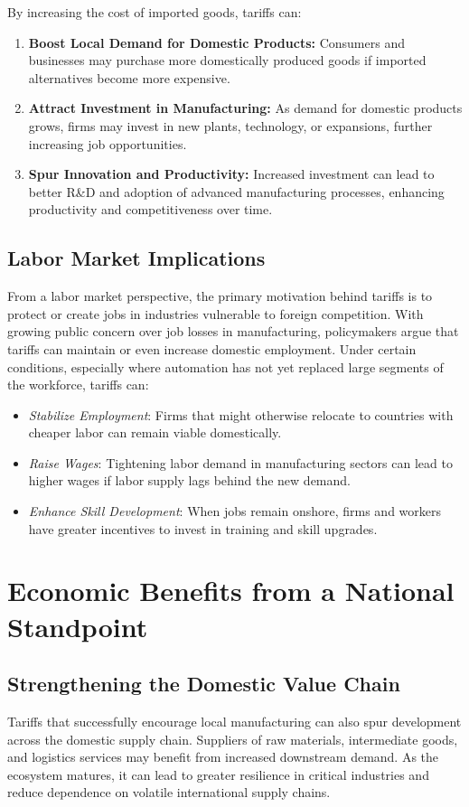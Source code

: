 \documentclass[12pt]{article}
\begin{document}
By increasing the cost of imported goods, tariffs can:
\begin{enumerate}
    \item \textbf{Boost Local Demand for Domestic Products:} Consumers and businesses may purchase more domestically produced goods if imported alternatives become more expensive.
    \item \textbf{Attract Investment in Manufacturing:} As demand for domestic products grows, firms may invest in new plants, technology, or expansions, further increasing job opportunities.
    \item \textbf{Spur Innovation and Productivity:} Increased investment can lead to better R\&D and adoption of advanced manufacturing processes, enhancing productivity and competitiveness over time.
\end{enumerate}

\subsection{Labor Market Implications}
From a labor market perspective, the primary motivation behind tariffs is to protect or create jobs in industries vulnerable to foreign competition. With growing public concern over job losses in manufacturing, policymakers argue that tariffs can maintain or even increase domestic employment. Under certain conditions, especially where automation has not yet replaced large segments of the workforce, tariffs can:
\begin{itemize}
    \item \textit{Stabilize Employment}: Firms that might otherwise relocate to countries with cheaper labor can remain viable domestically.
    \item \textit{Raise Wages}: Tightening labor demand in manufacturing sectors can lead to higher wages if labor supply lags behind the new demand.
    \item \textit{Enhance Skill Development}: When jobs remain onshore, firms and workers have greater incentives to invest in training and skill upgrades.
\end{itemize}

\section{Economic Benefits from a National Standpoint}

\subsection{Strengthening the Domestic Value Chain}
Tariffs that successfully encourage local manufacturing can also spur development across the domestic supply chain. Suppliers of raw materials, intermediate goods, and logistics services may benefit from increased downstream demand. As the ecosystem matures, it can lead to greater resilience in critical industries and reduce dependence on volatile international supply chains.
\end{document}
